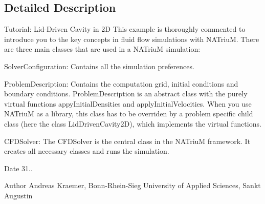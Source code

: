 \subsection{Detailed Description}
Tutorial\-: Lid-\/\-Driven Cavity in 2\-D This example is thoroughly commented to introduce you to the key concepts in fluid flow simulations with N\-A\-Triu\-M. There are three main classes that are used in a N\-A\-Triu\-M simulation\-: 
\begin{DoxyItemize}
\item Solver\-Configuration\-: Contains all the simulation preferences.
\item Problem\-Description\-: Contains the computation grid, initial conditions and boundary conditions. Problem\-Description is an abstract class with the purely virtual functions appy\-Initial\-Densities and apply\-Initial\-Velocities. When you use N\-A\-Triu\-M as a library, this class has to be overriden by a problem specific child class (here the class Lid\-Driven\-Cavity2\-D), which implements the virtual functions.
\item C\-F\-D\-Solver\-: The C\-F\-D\-Solver is the central class in the N\-A\-Triu\-M framework. It creates all necessary classes and runs the simulation. \begin{DoxyDate}{Date}
31.. 
\end{DoxyDate}
\begin{DoxyAuthor}{Author}
Andreas Kraemer, Bonn-\/\-Rhein-\/\-Sieg University of Applied Sciences, Sankt Augustin 
\end{DoxyAuthor}

\end{DoxyItemize}